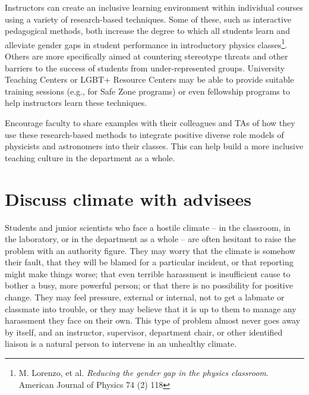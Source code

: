 Instructors can create an inclusive learning environment within individual courses using a variety of research-based techniques. Some of these, such as interactive pedagogical methods, both increase the degree to which all students learn and alleviate gender gaps in student performance in introductory physics classes\footnote{M. Lorenzo, et al. \emph{Reducing the gender gap in the physics classroom}. American Journal of Physics 74 (2) 118}. Others are more specifically aimed at countering stereotype threats and other barriers to the success of students from under-represented groups. University Teaching Centers or LGBT+ Resource Centers may be able to provide suitable training sessions (e.g., for Safe Zone programs) or even fellowship programs to help instructors learn these techniques. 

Encourage faculty to share examples with their colleagues and TAs of how they use these research-based methods to integrate positive diverse role models of physicists and astronomers into their classes. This can help build a more inclusive teaching culture in the department as a whole.


\section {Discuss climate with advisees}
\label{talk-advisees}
Students and junior scientists who face a hostile climate -- in the classroom, in the laboratory, or in the department as a whole -- are often hesitant to raise the problem with an authority figure. They may worry that the climate is somehow their fault, that they will be blamed for a particular incident, or that reporting might make things worse; that even terrible harassment is insufficient cause to bother a busy, more powerful person; or that there is no possibility for positive change. They may feel pressure, external or internal, not to get a labmate or classmate into trouble, or they may believe that it is up to them to manage any harassment they face on their own. This type of problem almost never goes away by itself, and an instructor, supervisor, department chair, or other identified liaison is a natural person to intervene in an unhealthy climate.

